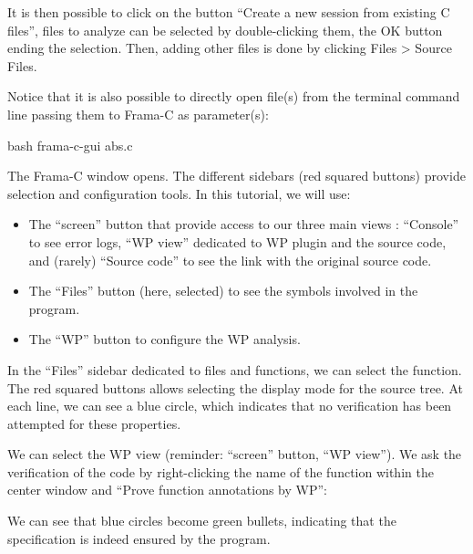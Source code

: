 It is then possible to click on the button ``Create a new session from
existing C files'', files to analyze can be selected by double-clicking
them, the OK button ending the selection. Then, adding other files is
done by clicking Files > Source Files.



Notice that it is also possible to directly open file(s) from the
terminal command line passing them to Frama-C as parameter(s):



\begin{CodeBlock}{bash}
frama-c-gui abs.c
\end{CodeBlock}





The Frama-C window opens. The different sidebars (red squared buttons) provide
selection and configuration tools. In this tutorial, we will use:
\begin{itemize}
  \item The ``screen'' button that provide access to our three main views :
        ``Console'' to see error logs, ``WP view'' dedicated to WP plugin and
        the source code, and (rarely) ``Source code'' to see the link with the
        original source code.
  \item The ``Files'' button (here, selected) to see the symbols involved in the
        program.
  \item The ``WP'' button to configure the WP analysis.
\end{itemize}
In the ``Files'' sidebar dedicated to files and functions, we can select the
 function. The red squared buttons allows selecting the display
mode for the source tree.
At each  line, we can see a blue circle, which indicates
that no verification has been attempted for these properties.


We can select the WP view (reminder: ``screen'' button, ``WP view'').
We ask the verification of the code by right-clicking the name of the
function within the center window and ``Prove function annotations by WP'':





We can see that blue circles become green bullets, indicating that the
specification is indeed ensured by the program.





